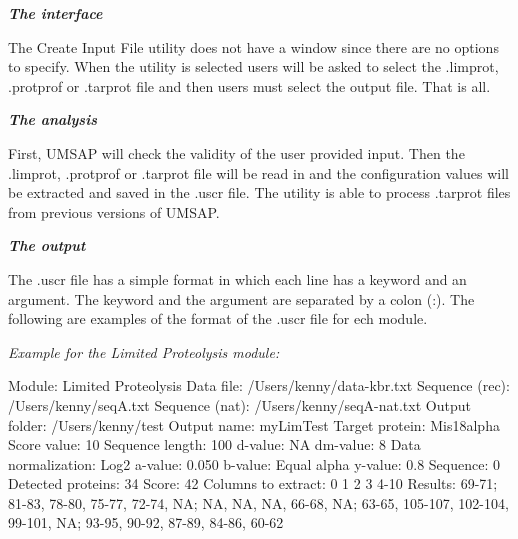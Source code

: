 \textit{\textbf{The interface}}

The Create Input File utility does not have a window since there are no options to specify. When the utility is selected users will be asked to select the .limprot, .protprof or .tarprot file and then users must select the output file. That is all.

\textit{\textbf{The analysis}}

First, UMSAP will check the validity of the user provided input. Then the .limprot, .protprof or .tarprot file will be read in and the configuration values will be extracted and saved in the .uscr file. The utility is able to process .tarprot files from previous versions of UMSAP.

\textit{\textbf{The output}}

The .uscr file has a simple format in which each line has a keyword and an argument. The keyword and the argument are separated by a colon (:). The following are examples of the format of the .uscr file for ech module.\newline

\textit{Example for the Limited Proteolysis module:}

Module: Limited Proteolysis\newline
Data file: /Users/kenny/data-kbr.txt\newline
Sequence (rec): /Users/kenny/seqA.txt\newline
Sequence (nat): /Users/kenny/seqA-nat.txt\newline
Output folder: /Users/kenny/test\newline
Output name: myLimTest\newline
Target protein: Mis18alpha\newline
Score value: 10\newline
Sequence length: 100\newline
d-value: NA\newline
dm-value: 8\newline
Data normalization: Log2\newline
a-value: 0.050\newline
b-value: Equal alpha\newline
y-value: 0.8\newline
Sequence: 0\newline
Detected proteins: 34\newline
Score: 42\newline
Columns to extract: 0 1 2 3 4-10\newline
Results: 69-71; 81-83, 78-80, 75-77, 72-74, NA; NA, NA, NA, 66-68, NA; 63-65, 105-107, 102-104, 99-101, NA; 93-95, 90-92, 87-89, 84-86, 60-62\newline

